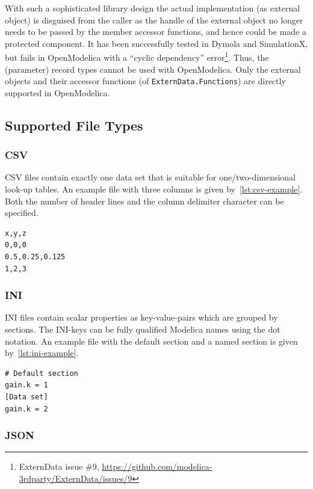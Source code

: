 \documentclass{modelica}
\newcommand{\modelica}[1]{\lstinline[language=modelica]|#1|}
\begin{document}
With such a sophisticated library design the actual implementation (as external object) is disguised from the caller as the handle of the external object no longer needs to be passed by the member accessor functions, and hence could be made a protected component.
It has been successfully tested in Dymola and SimulationX, but fails in OpenModelica with a ``cyclic dependency'' error\footnote{ExternData issue \#9, \url{https://github.com/modelica-3rdparty/ExternData/issues/9}}.
Thus, the (parameter) record types cannot be used with OpenModelica.
Only the external objects and their accessor functions (of \modelica{ExternData.Functions}) are directly supported in OpenModelica.

\subsection{Supported File Types}

\subsubsection*{CSV}

CSV files contain exactly one data set that is suitable for one/two-dimensional look-up tables.
An example file with three columns is given by~\autoref{lst:csv-example}.
Both the number of header lines and the column delimiter character can be specified.

\begin{lstlisting}[caption=Example CSV file, label=lst:csv-example]
x,y,z
0,0,0
0.5,0.25,0.125
1,2,3
\end{lstlisting}

\subsubsection*{INI}

INI files contain scalar properties as key-value-pairs which are grouped by sections.
The INI-keys can be fully qualified Modelica names using the dot notation.
An example file with the default section and a named section is given by~\autoref{lst:ini-example}.

\begin{lstlisting}[caption=Example INI file, label=lst:ini-example]
# Default section
gain.k = 1
[Data set]
gain.k = 2
\end{lstlisting}

\subsubsection*{JSON}
\end{document}
